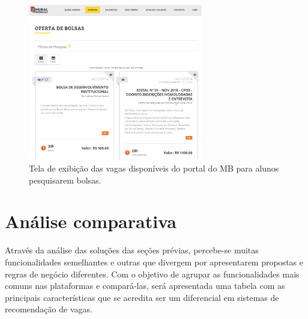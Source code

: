 \begin{figure}[h]
    \caption{Tela de exibição das vagas disponíveis do portal do MB para alunos pesquisarem bolsas.}
       	\begin{center}
            \includegraphics[width=0.68\textwidth]{figuras/rel07.png}
        \end{center}
    \label{telaVagasMB}
\end{figure}

\section{Análise comparativa}
\label{trabRelAnalise}

Através da análise das soluções das seções prévias, percebe-se muitas funcionalidades semelhantes e outras que divergem por apresentarem propostas e regras de negócio diferentes. Com o objetivo de agrupar as funcionalidades mais comuns nas plataformas e compará-las, será apresentada uma tabela com as principais características que se acredita ser um diferencial em sistemas de recomendação de vagas. 

